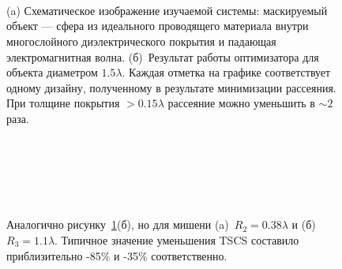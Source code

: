 \begin{figure}[p]
  \begin{minipage}[ht]{0.99\linewidth}
  \end{minipage}\\
  \vfill
  \begin{minipage}[ht]{0.99\linewidth}
  \end{minipage}\\
  \vfill
  \begin{minipage}[ht]{0.99\linewidth}
  \end{minipage}\\
  \vfill
  \begin{minipage}[ht]{0.99\linewidth}
  \end{minipage}
  \vfill

  \caption{(a) Схематическое изображение изучаемой системы:
    маскируемый объект --- сфера из идеального проводящего материала
    внутри многослойного диэлектрического покрытия и падающая
    электромагнитная волна. (б)~Результат работы оптимизатора для
    объекта диаметром $1.5\lambda$.  Каждая отметка на графике
    соответствует одному дизайну, полученному в результате
    минимизации рассеяния. При толщине покрытия $>0.15\lambda$
    рассеяние можно уменьшить в $\sim 2$ раза.}
  \label{img:scattering}  
\end{figure}

\begin{figure}[p]
  \begin{minipage}[ht]{0.99\linewidth}
  \end{minipage}\\
  \begin{minipage}[ht]{0.99\linewidth}
  \end{minipage}\\
  \vfill
  \begin{minipage}[ht]{0.99\linewidth}
  \end{minipage}\\
  \begin{minipage}[ht]{0.99\linewidth}
  \end{minipage}
  \vfill
  \caption{Аналогично рисунку~\ref{img:scattering}(б), но для мишени
    (a)~${R_2 = 0.38\lambda}$ и (б)~${R_3 = 1.1\lambda}$.  Типичное
    значение уменьшения TSCS составило приблизительно -85\% и -35\%
    соответственно.  \label{img:rcs-overview-r14-42}}%
\end{figure}


